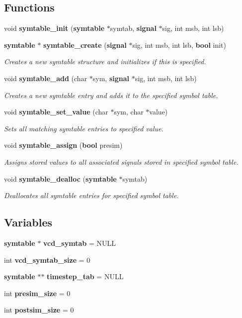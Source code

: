 \subsection*{Functions}
\begin{CompactItemize}
\item 
void {\bf symtable\_\-init} ({\bf symtable} $\ast$symtab, {\bf signal} $\ast$sig, int msb, int lsb)
\item 
{\bf symtable} $\ast$ {\bf symtable\_\-create} ({\bf signal} $\ast$sig, int msb, int lsb, {\bf bool} init)
\begin{CompactList}\small\item\em Creates a new symtable structure and initializes if this is specified. \item\end{CompactList}\item 
void {\bf symtable\_\-add} (char $\ast$sym, {\bf signal} $\ast$sig, int msb, int lsb)
\begin{CompactList}\small\item\em Creates a new symtable entry and adds it to the specified symbol table. \item\end{CompactList}\item 
void {\bf symtable\_\-set\_\-value} (char $\ast$sym, char $\ast$value)
\begin{CompactList}\small\item\em Sets all matching symtable entries to specified value. \item\end{CompactList}\item 
void {\bf symtable\_\-assign} ({\bf bool} presim)
\begin{CompactList}\small\item\em Assigns stored values to all associated signals stored in specified symbol table. \item\end{CompactList}\item 
void {\bf symtable\_\-dealloc} ({\bf symtable} $\ast$symtab)
\begin{CompactList}\small\item\em Deallocates all symtable entries for specified symbol table. \item\end{CompactList}\end{CompactItemize}
\subsection*{Variables}
\begin{CompactItemize}
\item 
{\bf symtable} $\ast$ {\bf vcd\_\-symtab} = NULL
\item 
int {\bf vcd\_\-symtab\_\-size} = 0
\item 
{\bf symtable} $\ast$$\ast$ {\bf timestep\_\-tab} = NULL
\item 
int {\bf presim\_\-size} = 0
\item 
int {\bf postsim\_\-size} = 0
\end{CompactItemize}


